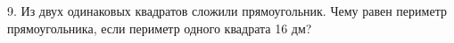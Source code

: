 9. Из двух одинаковых квадратов сложили прямоугольник. Чему равен периметр прямоугольника, если периметр одного квадрата 16 дм?\\
